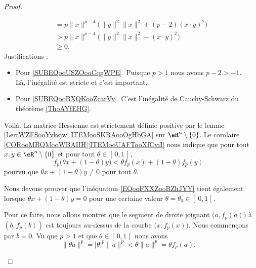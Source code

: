 \begin{proof}
\begin{subproof}
\begin{subequations}
\begin{align}
                              & = p\| x \|^{p-4}\big( \| y \|^2\| x \|^2+(p-2)(x\cdot y)^2 \big)    \\
                              & > p\| x \|^{p-4}\big( \| y \|^2\| x \|^2-(x\cdot y)^2 \big)         \label{SUBEQooUSZOooCqgWPE}\\
                              & \geq  0           \label{SUBEQooBXQKooZcarVv}.
            \end{align}
        \end{subequations}
        Justifications :
        \begin{itemize}
            \item Pour \ref{SUBEQooUSZOooCqgWPE}.
                Puisque \( p>1\) nous avons \( p-2>-1\). Là, l'inégalité est stricte et c'est important.
            \item Pour \ref{SUBEQooBXQKooZcarVv}. C'est l'inégalité de Cauchy-Schwarz du théorème \ref{ThoAYfEHG}.
        \end{itemize}
        Voilà. La matrice Hessienne est strictement définie positive par le lemme \ref{LemWZFSooYvksjw}\ref{ITEMooSKRAooOgHbGA} sur \( \eR^n\setminus\{ 0 \}\). Le corolaire \ref{CORooMBQMooWBAIIH}\ref{ITEMooUAFTooXfCviI} nous indique que pour tout \( x,y\in \eR^n\setminus\{ 0 \}\) et pour tout \( \theta\in \mathopen] 0 , 1 \mathclose[\),
        \begin{equation}        \label{EQooFXXZooBZhJYY}
            f_p\big( \theta x+(1-\theta)y \big)<\theta f_p(x)+(1-\theta)f_p(y)
        \end{equation}
        pourvu que \( \theta x+ (1-\theta)y\neq 0\) pour tout \( \theta\).

    \item[La suite]

        Nous devons prouver que l'inéquation \eqref{EQooFXXZooBZhJYY} tient également lorsque \( \theta x+(1-\theta)y=0\) pour une certaine valeur \( \theta=\theta_0\in \mathopen] 0 , 1 \mathclose[\).

    \item[Les cordes passant par zéro]

        Pour ce faire, nous allons montrer que le segment de droite joignant \( \big( a,f_p(a) \big)\) à \( (b,f_p(b))\) est toujours au-dessus de la courbe \( \big( x,f_p(x) \big)\). Nous commençons par \( b=0\). Vu que \( p>1\) et que \( \theta\in \mathopen] 0 , 1 \mathclose[\) nous avons
        \begin{equation}
            \| \theta a \|^p=| \theta |^p\| a \|^p<\theta\| a \|^p=\theta f_p(a).
        \end{equation}


\end{subproof}
\end{proof}
